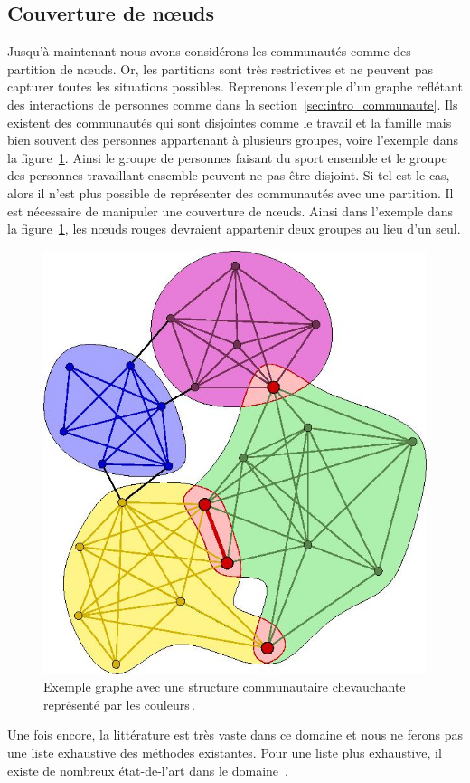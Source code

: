 
\subsection{Couverture de n\oe uds}
\label{subsec:cover}
Jusqu'à maintenant nous avons considérons les communautés comme des partition de n\oe uds.
Or, les partitions sont très restrictives et ne peuvent pas capturer toutes les situations possibles.
Reprenons l'exemple d'un graphe reflétant des interactions de personnes comme dans la section~\ref{sec:intro_communaute}.
Ils existent des communautés qui sont disjointes comme le travail et la famille mais bien souvent des personnes appartenant à plusieurs groupes, voire l'exemple dans la figure~\ref{fig:ex_overlap_communaute}.
Ainsi le groupe de personnes faisant du sport ensemble et le groupe des personnes travaillant ensemble peuvent ne pas être disjoint.
Si tel est le cas, alors il n'est plus possible de représenter des communautés avec une partition.
Il est nécessaire de manipuler une couverture de n\oe uds.
Ainsi dans l'exemple dans la figure~\ref{fig:ex_overlap_communaute}, les n\oe uds rouges devraient appartenir deux groupes au lieu d'un seul.

\begin{figure}
	\centering
	\includegraphics[width=0.31\linewidth]{img/Intro/Illustration_of_overlapping_communities.jpg}
	\caption{Exemple graphe avec une structure communautaire chevauchante représenté par les couleurs\,\protect\footnotemark.}
	\label{fig:ex_overlap_communaute}
\end{figure}

Une fois encore, la littérature est très vaste dans ce domaine et nous ne ferons pas une liste exhaustive des méthodes existantes.
Pour une liste plus exhaustive, il existe de nombreux état-de-l'art dans le domaine~\cite{Danisch2012, Kanawati2014, Xie2013,Bandyopadhyay2015, Hric2014a}.

